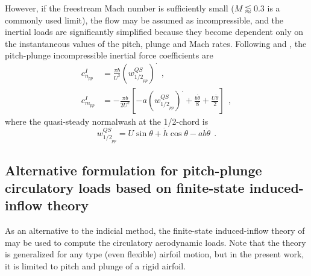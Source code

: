 \documentclass[12pt,a4paper,oneside,english]{abntex2} %
\def\lb{\left[}
\def\rb{\right]}
\def\lp{\left(}
\def\rp{\right)}
\def\dotout{^{\boldsymbol{\cdot}}}
\def\thetadot{\dot{\theta}}
\def\thetaddot{\ddot{\theta}}
\def\hdot{\dot{h}}
\begin{document}
However, if the freestream Mach number is sufficiently small ($M\lessapprox0.3$ is a commonly used limit), the flow may be assumed as incompressible, and the inertial loads are significantly simplified because they become dependent only on the instantaneous values of the pitch, plunge and Mach rates. Following  and , the pitch-plunge incompressible inertial force coefficients are
\begin{align}
    c_{n_{pp}}^{I} &= \frac{\pi b}{U^2} \lp w_{{1/2}_{pp}}^{QS}\rp\dotout \ \ ,
    \label{eq:cnI_pp_inc}
    \\
    c_{m_{pp}}^{I} &= -\frac{\pi b}{2U^2} \lb -a\lp w_{{1/2}_{pp}}^{QS}\rp\dotout + \frac{b\thetaddot}{8} + \frac{U\thetadot}{2} \rb \ \ ,
    \label{eq:cmI_pp_inc}
\end{align}
where the quasi-steady normalwash at the 1/2-chord is
\begin{equation}
    w_{{1/2}_{pp}}^{QS} = U\sin\theta + \hdot\cos\theta - ab\thetadot \ \ .
    \label{eq:w_12pp_QS}
\end{equation}

\subsection{Alternative formulation for pitch-plunge circulatory loads based on finite-state induced-inflow theory}
\label{subsec:inflow_theory}

As an alternative to the indicial method, the finite-state induced-inflow theory of  may be used to compute the circulatory aerodynamic loads. Note that the theory is generalized for any type (even flexible) airfoil motion, but in the present work, it is limited to pitch and plunge of a rigid airfoil. 
\end{document}
